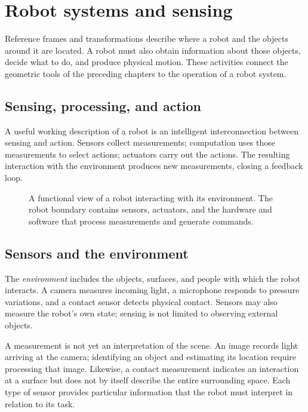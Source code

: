\chapter{Robot systems and sensing}
\label{chap:lecture06}

Reference frames and transformations describe where a robot and the objects
around it are located. A robot must also obtain information about those objects,
decide what to do, and produce physical motion. These activities connect the
geometric tools of the preceding chapters to the operation of a robot system.

\section{Sensing, processing, and action}
A useful working description of a robot is an intelligent interconnection
between sensing and action. Sensors collect measurements; computation uses
those measurements to select actions; actuators carry out the actions.
The resulting interaction with the environment produces new measurements,
closing a feedback loop.

\begin{figure}[htbp]
\centering
\caption{A functional view of a robot interacting with its environment.
The robot boundary contains sensors, actuators, and the hardware and software
that process measurements and generate commands.}
\label{fig:l06-components}
\end{figure}

\section{Sensors and the environment}
The \emph{environment} includes the objects, surfaces, and people with which
the robot interacts. A camera measures incoming light, a microphone responds
to pressure variations, and a contact sensor detects physical contact.
Sensors may also measure the robot's own state; sensing is not limited to
observing external objects.

A measurement is not yet an interpretation of the scene. An image records
light arriving at the camera; identifying an object and estimating its
location require processing that image. Likewise, a contact measurement
indicates an interaction at a surface but does not by itself describe the
entire surrounding space. Each type of sensor provides particular information
that the robot must interpret in relation to its task.

